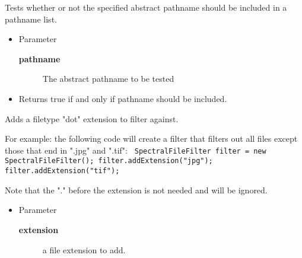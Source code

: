 \methods
{}
\begin{desc}Tests whether or not the specified abstract pathname should be
 included in a pathname list.
\begin{itemize}
\item{Parameter
  \begin{description}
   \item[\textbf{pathname}]{The abstract pathname to be tested}
  \end{description}}
\end{itemize}
\begin{itemize}
\item{Returns true if and only if pathname should be included. }
\end{itemize}
\end{desc}

\begin{desc}Adds a filetype "dot" extension to filter against.

 For example: the following code will create a filter that filters
 out all files except those that end in ".jpg" and ".tif":
 \texttt{
\mbox{}\newline
   SpectralFileFilter filter = new SpectralFileFilter();\mbox{}\newline
   filter.addExtension("jpg");\mbox{}\newline
   filter.addExtension("tif");\mbox{}\newline
 }

 Note that the "." before the extension is not needed and will
 be ignored.
\begin{itemize}
\item{Parameter
  \begin{description}
   \item[\textbf{extension}]{a file extension to add.}
  \end{description}}
\end{itemize}
\end{desc}

